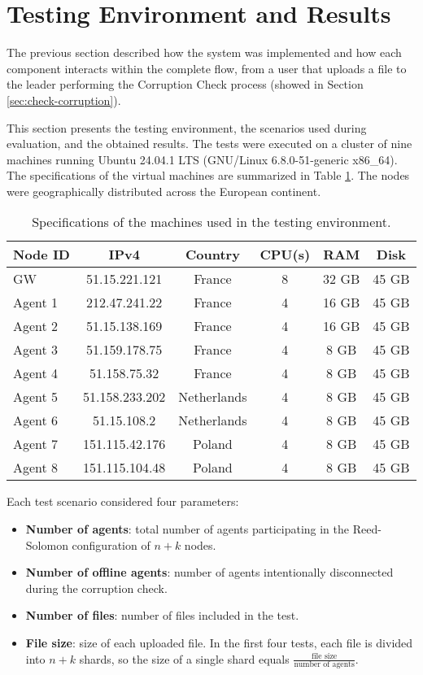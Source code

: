 \section{Testing Environment and Results}

The previous section described how the system was implemented and how each
component interacts within the complete flow, from a user that uploads a file to
the leader performing the Corruption Check process (showed in Section
\ref{sec:check-corruption}).

This section presents the testing environment, the scenarios used during evaluation, and the obtained results. The tests were executed on a cluster of nine machines running Ubuntu 24.04.1 LTS (GNU/Linux 6.8.0-51-generic x86\_64). The specifications of the virtual machines are summarized in Table \ref{tab:vms-specs}. The nodes were geographically distributed across the European continent.

\begin{table}[h!]
    \centering
    \begin{tabular}{|l|c|c|c|c|c|}
    \hline
        \textbf{Node ID} & \textbf{IPv4} & \textbf{Country} & \textbf{CPU(s)} & \textbf{RAM} & \textbf{Disk} \\
       \hline
        GW & 51.15.221.121 & France & 8 & 32 GB & 45 GB \\
        Agent 1 & 212.47.241.22 & France & 4 & 16 GB & 45 GB \\
        Agent 2 & 51.15.138.169 & France & 4 & 16 GB & 45 GB \\
        Agent 3 & 51.159.178.75 & France & 4 & 8 GB & 45 GB \\
        Agent 4 & 51.158.75.32 & France & 4 & 8 GB & 45 GB \\
        Agent 5 & 51.158.233.202 & Netherlands & 4 & 8 GB & 45 GB \\
        Agent 6 & 51.15.108.2 & Netherlands & 4 & 8 GB & 45 GB \\
        Agent 7 & 151.115.42.176 & Poland & 4 & 8 GB & 45 GB \\
        Agent 8 & 151.115.104.48 & Poland & 4 & 8 GB & 45 GB \\
        \hline
    \end{tabular}
    \caption{Specifications of the machines used in the testing environment.}
    \label{tab:vms-specs}
\end{table}

Each test scenario considered four parameters:
\begin{itemize}
    \item \textbf{Number of agents}: total number of agents participating in the Reed-Solomon configuration of $n + k$ nodes.
    \item \textbf{Number of offline agents}: number of agents intentionally
        disconnected during the corruption check.
    \item \textbf{Number of files}: number of files included in the test.
    \item \textbf{File size}: size of each uploaded file. In the first four tests, each file is divided into $n + k$ shards, so the size of a single shard equals $\frac{\text{file size}}{\text{number of agents}}$.
\end{itemize}

